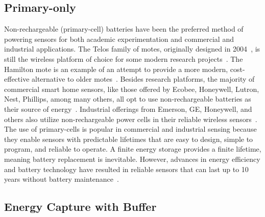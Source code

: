 \subsection{Primary-only}
Non-rechargeable (primary-cell) batteries have been the preferred
method of powering sensors for both academic experimentation
and commercial and industrial applications. 
The Telos family of motes, originally designed in 2004~\cite{polastre2005telos},
is still the wireless platform of choice for some modern research projects~\cite{mohammad2018codecast,li2019privacy}.
The Hamilton mote is an example of an attempt to provide a more modern, cost-effective alternative to older motes~\cite{andersen2017hamilton}.
Besides research platforms, the majority of commercial smart home sensors, like those offered by Ecobee, Honeywell, Lutron, Nest, Phillips, among many others, all opt to use non-rechargeable batteries as their source of energy~\cite{ecobeeSensor, honeywellThermostat, lutronSolutions, googleNestTemperature, hueSensor}. Industrial offerings from Emerson, GE, Honeywell, and others also utilize non-rechargeable power cells in their reliable wireless sensors~\cite{emersonRosemount,GEInsightMesh,honeywellOneWireless}.
The use of primary-cells is popular in commercial and industrial sensing because they enable sensors with predictable lifetimes that are easy to
design, simple to program, and reliable to operate. 
A finite energy storage provides a finite lifetime, meaning battery replacement is inevitable. However, advances in energy efficiency and battery technology have resulted in reliable sensors that can last up to 10 years without battery maintenance~\cite{emersonRosemount,honeywellOneWireless, lutronSolutions}. 

\subsection{Energy Capture with Buffer}

